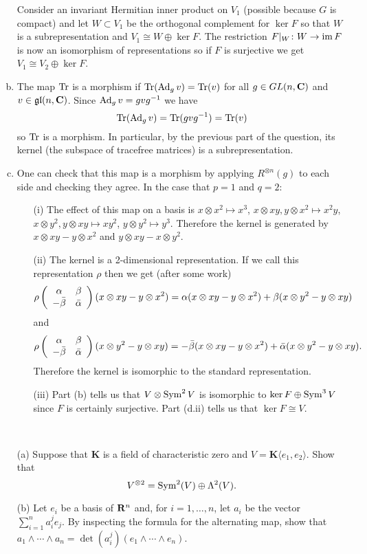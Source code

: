 \documentclass[12pt]{article}
\begin{document}
\begin{answer}
\begin{enumerate}[(a)]
Consider an invariant Hermitian inner product on $V_1$ (possible because $G$ is compact) and let $W\subset V_1$ be the orthogonal complement for $\ker F$ so that $W$ is a subrepresentation and $V_1\cong W\oplus \ker F$. The restriction $F|_W\colon W\to \operatorname{im} F$ is now an isomorphism of representations so if $F$ is surjective we get $V_1\cong V_2\oplus\ker F$.
\item The map $\operatorname{Tr}$ is a morphism if $\operatorname{Tr}(\operatorname{Ad}_gv)=\operatorname{Tr}(v)$ for all $g\in GL(n,\mathbf{C})$ and $v\in\mathfrak{gl}(n,\mathbf{C})$. Since $\operatorname{Ad}_gv=gvg^{-1}$ we have
\[\operatorname{Tr}(\operatorname{Ad}_gv)=\operatorname{Tr}(gvg^{-1})=\operatorname{Tr}(v)\]
so $\operatorname{Tr}$ is a morphism. In particular, by the previous part of the question, its kernel (the subspace of tracefree matrices) is a subrepresentation.
\item One can check that this map is a morphism by applying $R^{\otimes n}(g)$ to each side and checking they agree. In the case that $p=1$ and $q=2$:
\begin{enumerate}
\item[(i)] The effect of this map on a basis is $x\otimes x^2\mapsto x^3$, $x\otimes xy,y\otimes x^2\mapsto x^2y$, $x\otimes y^2,y\otimes xy\mapsto xy^2$, $y\otimes y^2\mapsto y^3$. Therefore the kernel is generated by $x\otimes xy-y\otimes x^2$ and $y\otimes xy-x\otimes y^2$.
\item[(ii)] The kernel is a 2-dimensional representation. If we call this representation $\rho$ then we get (after some work)
\[\rho\left(\begin{array}{cc}\alpha & \beta\\ -\bar{\beta} & \bar{\alpha}\end{array}\right)(x\otimes xy-y\otimes x^2)=\alpha(x\otimes xy-y\otimes x^2)+\beta(x\otimes y^2-y\otimes xy)\]
and
\[\rho\left(\begin{array}{cc}\alpha & \beta\\ -\bar{\beta} & \bar{\alpha}\end{array}\right)(x\otimes y^2-y\otimes xy)=-\bar{\beta}(x\otimes xy-y\otimes x^2)+\bar{\alpha}(x\otimes y^2-y\otimes xy).\]
Therefore the kernel is isomorphic to the standard representation.
\item[(iii)] Part (b) tells us that $V\otimes \operatorname{Sym}^2V$ is isomorphic to $\ker F\oplus \operatorname{Sym}^3V$ since $F$ is certainly surjective. Part (d.ii) tells us that $\ker F\cong V$.
\end{enumerate}
\end{enumerate}
\end{answer}
\newpage

\begin{question}\ \\
\begin{enumerate}
\item[(a)] Suppose that $\mathbf{K}$ is a field of characteristic zero and $V=\mathbf{K}\langle e_1,e_2\rangle$. Show that
\[V^{\otimes 2}=\operatorname{Sym}^2(V)\oplus\Lambda^2(V).\]
\item[(b)] Let $e_i$ be a basis of $\mathbf{R}^n$ and, for $i=1,\ldots,n$, let $a_i$ be the vector $\sum_{i=1}^n a_i^je_j$. By inspecting the formula for the alternating map, show that $a_1\wedge\cdots\wedge a_n=\det(a^j_i)(e_1\wedge\cdots\wedge e_n)$.
\end{enumerate}
\end{question}
\end{document}
